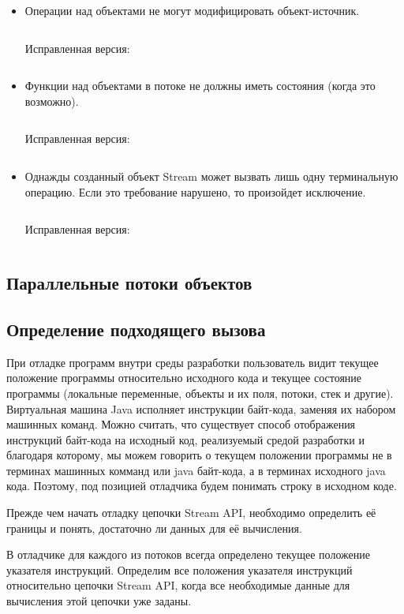 \begin{itemize}
	\item Операции над объектами не могут модифицировать объект-источник.
	\inputminted{java}{chapter2/code/SourceModification.java}
	Исправленная версия:
	\inputminted{java}{chapter2/code/SourceModificationFixed.java}
	\item Функции над объектами в потоке не должны иметь состояния (когда это возможно).
	\inputminted{java}{chapter2/code/StatefulOperation.java}
	Исправленная версия:
	\inputminted{java}{chapter2/code/StatefulOperationFixed.java}
	\item Однажды созданный объект Stream может вызвать лишь одну терминальную операцию. Если это требование нарушено, то произойдет исключение.
	\inputminted{java}{chapter2/code/OneTermination.java}
	Исправленная версия:
	\inputminted{java}{chapter2/code/OneTerminationFixed.java}
\end{itemize}

\subsection{Параллельные потоки объектов}


\subsection{Определение подходящего вызова} \label{detection}
При отладке программ внутри среды разработки пользователь видит текущее положение программы относительно исходного кода и текущее состояние программы (локальные переменные, объекты и их поля, потоки, стек и другие). Виртуальная машина Java исполняет инструкции байт-кода, заменяя их набором машинных команд. Можно считать, что существует способ отображения инструкций байт-кода на исходный код, реализуемый средой разработки и благодаря которому, мы можем говорить о текущем положении программы не в терминах машинных комманд или java байт-кода, а в терминах исходного java кода. Поэтому, под позицией отладчика будем понимать строку в исходном коде.

Прежде чем начать отладку цепочки Stream API, необходимо определить её границы и понять, достаточно ли данных для её вычисления.

В отладчике для каждого из потоков всегда определено текущее положение указателя инструкций.  Определим все положения указателя инструкций относительно цепочки Stream API, когда все необходимые данные для вычисления этой цепочки уже заданы.

